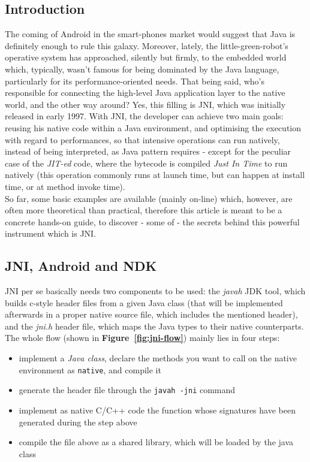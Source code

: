 \documentclass[a4paper,10pt]{article}
\newcommand{\keyword}[1]{\texttt{#1}}
\newcommand{\reff}[1]{\textbf{Figure~\ref{#1}}}
\begin{document}
\vspace{6ex}	%
\begin{multicols}{2}

\section{Introduction}
The coming of Android in the smart-phones market would suggest that Java is
definitely enough to rule this galaxy. Moreover, lately, the little-green-robot's
operative system has approached, silently but firmly, to the embedded world
which, typically, wasn't famous for being dominated by the Java language, 
particularly for its performance-oriented needs. That being said, who's
responsible for connecting the high-level Java application layer to the native
world, and the other way around? Yes, this filling is JNI, which was initially
released in early 1997. With JNI, the developer can achieve two main goals: 
reusing his native code within a Java environment, and optimising the execution
with regard to performances, so that intensive operations can run natively, 
instead of being interpreted, as Java pattern requires - except for the peculiar
case of the \textit{JIT-ed} code, where the bytecode is compiled \textit{Just In 
Time} to run natively (this operation commonly runs at launch time, but can
happen at install time, or at method invoke time).\\
So far, some basic examples are available (mainly on-line) which, however, are
often more theoretical than practical, therefore this article is meant to be a
concrete hands-on guide, to discover - some of - the secrets behind this powerful
instrument which is JNI.

\subsection{JNI, Android and NDK}
\label{sec:jni-android-ndk}
JNI per se basically needs two components to be used: the \textit{javah} JDK
tool, which builds c-style header files from a given Java class (that will be
implemented afterwards in a proper native source file, which includes the
mentioned header), and the \textit{jni.h} header file, which maps the Java types
to their native counterparts. The whole flow (shown in \reff{fig:jni-flow})
mainly lies in four steps:
\begin{itemize}
\itemsep 0em
\item implement a \textit{Java class}, declare the methods you want to call
on the native environment as \keyword{native}, and compile it
\item generate the header file through the \keyword{javah -jni} command
\item implement as native C/C++ code the function whose signatures have been
generated during the step above
\item compile the file above as a shared library, which will be loaded by the
java class
\end{itemize}


\end{multicols}
\end{document}
